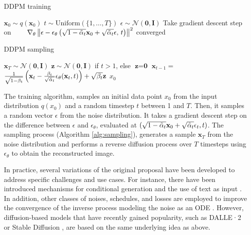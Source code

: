 \begin{multicols}{2}

\begin{algorithm}[H]
\caption{DDPM training}\label{alg:training}
\begin{algorithmic}
\Repeat
\State $\textbf{x}_0 \sim q(\textbf{x}_0)$
\State $t \sim \text{Uniform}(\{1, \ldots, T\})$
\State $\textbf{$\epsilon$} \sim \mathcal{N}(\textbf{0}, \textbf{I})$
\State Take gradient descent step on
\State \footnotesize{$\hspace{2em}  \nabla_\theta\left\| \textbf{$\epsilon$} - \textbf{$\epsilon$}_{\theta} \left(\sqrt{1 - \Tilde{\alpha}_t}\textbf{x}_0 + \sqrt{ \Tilde{\alpha}_t}\textbf{$\epsilon$}, \,t\right) \right\|^2$ }\normalsize{}
\Until converged
\end{algorithmic}
\end{algorithm}


\begin{algorithm}[H]
\caption{DDPM sampling}\label{alg:sampling}
\begin{algorithmic}
\State
\vspace{0.7em}
\State $\textbf{x}_T \sim \mathcal{N}(\textbf{0}, \textbf{I})$ 
\State $\textbf{z} \sim \mathcal{N}(\textbf{0}, \textbf{I})$ if $t>1$, else $\textbf{z}=\textbf{0}$
\State $\textbf{x}_{t-1} =$ \scriptsize{$\frac{1}{\sqrt{1 - \beta_t}} \left( \textbf{x}_t  - \frac{\beta_t}{\sqrt{ \Tilde{\alpha}_t}} \textbf{$\epsilon$}_\theta(\textbf{x}_t, t)   \right) + \sqrt{\beta_t} \textbf{z}$} \normalsize{}
\EndFor
\State \Return $x_0$
\end{algorithmic}
\end{algorithm}
\end{multicols}


The training algorithm, samples an initial data point $x_0$ from the input distribution $q(x_0)$ and a random timestep $t$ between 1 and $T$. Then, it samples a random vector \textbf{$\epsilon$} from the noise distribution. It takes a gradient descent step on the difference between \textbf{$\epsilon$} and $\textbf{$\epsilon$}_{\theta}$, evaluated at $(\sqrt{1 - \Tilde{\alpha}_t}\textbf{x}_0+\sqrt{\Tilde{\alpha}_t}\textbf{$\epsilon$}_t, t)$. The sampling process (Algorithm \ref{alg:sampling}), generates a sample $\textbf{x}_T$ from the noise distribution and performs a reverse diffusion process over $T$ timesteps using $\epsilon_\theta$ to obtain the reconstructed image.

In practice, several variations of the original proposal have been developed to address specific challenges and use cases. For instance, there have been introduced mechanisms for conditional generation \cite{Dhariwal2021} and the use of text as input \cite{Dalle2, rombach2022high}. In addition, other classes of noises, schedules, and losses are employed to improve the convergence of the inverse process modeling the noise as an ODE \cite{song2021scorebased}. However, diffusion-based models that have recently gained popularity, such as DALLE·2 \cite{Dalle2} or Stable Diffusion \cite{rombach2022high}, are based on the same underlying idea as above.

